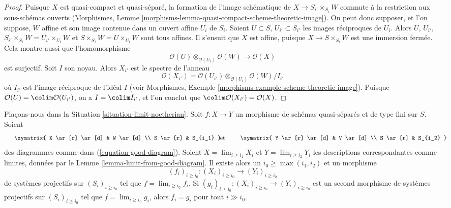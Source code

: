 \begin{proof}
Puisque $X$ est quasi-compact et quasi-séparé, la formation de
l'image schématique de $X \to S_{i'} \times_{S_i} W$
commute à la restriction aux sous-schémas ouverts
(Morphismes, Lemme \ref{morphisms-lemma-quasi-compact-scheme-theoretic-image}).
On peut donc supposer, et l'on suppose, $W$ affine et son image contenue dans un ouvert affine
$U_i$ de $S_i$. Soient $U \subset S$, $U_{i'} \subset S_{i'}$
les images réciproques de $U_i$. Alors $U$, $U_{i'}$,
$S_{i'} \times_{S_i} W = U_{i'} \times_{U_i} W$ et
$S \times_{S_i} W = U \times_{U_i} W$ sont tous affines.
Il s'ensuit que $X$ est affine, puisque $X \to S \times_{S_i} W$ est
une immersion fermée. Cela montre aussi que l'homomorphisme
$$
\mathcal{O}(U) \otimes_{\mathcal{O}(U_i)} \mathcal{O}(W) \to
\mathcal{O}(X)
$$
est surjectif. Soit $I$ son noyau. Alors $X_{i'}$
est le spectre de l'anneau
$$
\mathcal{O}(X_{i'}) =
\mathcal{O}(U_{i'}) \otimes_{\mathcal{O}(U_i)} \mathcal{O}(W)/I_{i'}
$$
où $I_{i'}$ est l'image réciproque de l'idéal $I$ (voir
Morphismes, Exemple \ref{morphisms-example-scheme-theoretic-image}).
Puisque $\mathcal{O}(U) = \colim \mathcal{O}(U_{i'})$,
on a $I = \colim I_{i'}$, et l'on conclut
que $\colim \mathcal{O}(X_{i'}) = \mathcal{O}(X)$.
\end{proof}

\begin{lemma}
\label{lemma-morphism-good-diagram}
Plaçons-nous dans la Situation \ref{situation-limit-noetherian}.
Soit $f : X \to Y$ un morphisme de schémas quasi-séparés
et de type fini sur $S$. Soient
$$
\vcenter{
\xymatrix{
X \ar[r] \ar[d] & W \ar[d] \\
S \ar[r] & S_{i_1}
}
}
\quad\text{et}\quad
\vcenter{
\xymatrix{
Y \ar[r] \ar[d] & V \ar[d] \\
S \ar[r] & S_{i_2}
}
}
$$
des diagrammes comme dans (\ref{equation-good-diagram}). Soient
$X = \lim_{i \geq i_1} X_i$ et
$Y = \lim_{i \geq i_2} Y_i$ les descriptions
correspondantes comme limites, données par le Lemme \ref{lemma-limit-from-good-diagram}.
Il existe alors un $i_0 \geq \max(i_1, i_2)$ et un morphisme
$$
(f_i)_{i \geq i_0} : (X_i)_{i \geq i_0} \to (Y_i)_{i \geq i_0}
$$
de systèmes projectifs sur $(S_i)_{i \geq i_0}$ tel que
$f = \lim_{i \geq i_0} f_i$.
Si $(g_i)_{i \geq i_0} : (X_i)_{i \geq i_0} \to (Y_i)_{i \geq i_0}$
est un second morphisme de systèmes projectifs sur $(S_i)_{i \geq i_0}$ tel que
$f = \lim_{i \geq i_0} g_i$,
alors $f_i = g_i$ pour tout $i \gg i_0$.
\end{lemma}

